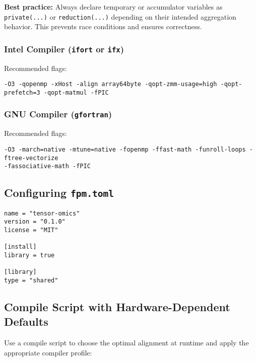 \documentclass{article}
\begin{document}
\noindent
\textbf{Best practice:} Always declare temporary or accumulator variables as \texttt{private(...)} or \texttt{reduction(...)} depending on their intended aggregation behavior. This prevents race conditions and ensures correctness.

\subsubsection{Intel Compiler (\texttt{ifort} or \texttt{ifx})}
\label{intel_flags}
Recommended flags:
\begin{verbatim}
-O3 -qopenmp -xHost -align array64byte -qopt-zmm-usage=high -qopt-prefetch=3 -qopt-matmul -fPIC
\end{verbatim}

\subsubsection{GNU Compiler (\texttt{gfortran})}
\label{gfortran_flags}
Recommended flags:
\begin{verbatim}
-O3 -march=native -mtune=native -fopenmp -ffast-math -funroll-loops -ftree-vectorize 
-fassociative-math -fPIC
\end{verbatim}

\subsection{Configuring \texttt{fpm.toml}}

\begin{verbatim}
name = "tensor-omics"
version = "0.1.0"
license = "MIT"

[install]
library = true

[library]
type = "shared" 
\end{verbatim}

\subsection{Compile Script with Hardware-Dependent Defaults}
Use a compile script to choose the optimal alignment at runtime and apply the appropriate compiler profile:
\end{document}
